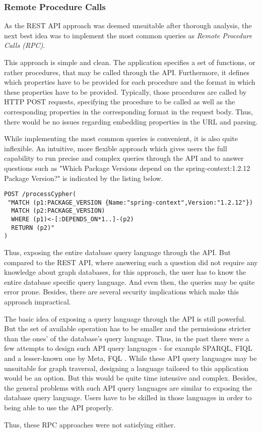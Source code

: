 \subsubsection{Remote Procedure Calls}
As the REST API approach was deemed unsuitable after thorough analysis, the next best idea was to implement the most common queries as \emph{Remote Procedure Calls (RPC)}.\par 
This approach is simple and clean. The application specifies a set of functions, or rather procedures, that may be called through the API. Furthermore, it defines which properties have to be provided for each procedure and the format in which these properties have to be provided. Typically, those procedures are called by HTTP POST requests, specifying the procedure to be called as well as the corresponding properties in the corresponding format in the request body. Thus, there would be no issues regarding embedding properties in the URL and parsing.\par
While implementing the most common queries is convenient, it is also quite inflexible. An intuitive, more flexible approach which gives users the full capability to run precise and complex queries through the API and to answer questions such as "Which Package Versions depend on the spring-context:1.2.12 Package Version?" is indicated by the listing below.

\begin{lstlisting}[caption=Exposing Cypher through API, captionpos=b, label=lst:CypherThroughAPI]
POST /processCypher(
 "MATCH (p1:PACKAGE_VERSION {Name:"spring-context",Version:"1.2.12"})
  MATCH (p2:PACKAGE_VERSION)
  WHERE (p1)<-[:DEPENDS_ON*1..]-(p2)
  RETURN (p2)"
)
\end{lstlisting}

Thus, exposing the entire database query language through the API. But compared to the REST API, where answering such a question did not require any knowledge about graph databases, for this approach, the user has to know the entire database specific query language. And even then, the queries may be quite error prone. Besides, there are several security implications which make this approach impractical.\par
The basic idea of exposing a query language through the API is still powerful. But the set of available operation has to be smaller and the permissions stricter than the ones' of the database's query language. Thus, in the past there were a few attempts to design such API query languages - for example SPARQL, FIQL and a lesser-known one by Meta, FQL \cite{APIYouWontHate}. %
While these API query languages may be unsuitable for graph traversal, designing a language tailored to this application would be an option. But this would be quite time intensive and complex. Besides, the general problems with such API query languages are similar to exposing the database query language. Users have to be skilled in those languages in order to being able to use the API properly.\par
Thus, these RPC approaches were not satisfying either.

